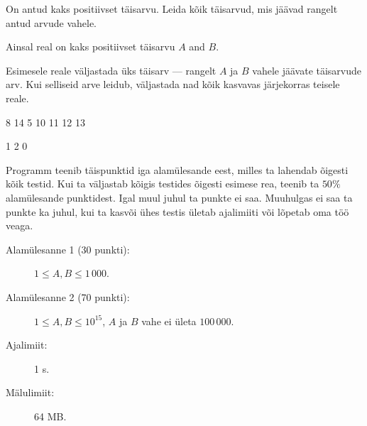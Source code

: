 \documentclass{boi2014-et}
\begin{document}
    On antud kaks positiivset täisarvu. Leida kõik täisarvud, mis
    jäävad rangelt antud arvude vahele.

    \Input

    Ainsal real on kaks positiivset täisarvu $A$ and $B$.

    \Output

    Esimesele reale väljastada üks täisarv --- rangelt $A$ ja $B$
    vahele jäävate täisarvude arv. Kui selliseid arve leidub,
    väljastada nad kõik kasvavas järjekorras teisele reale.
    
    \Examples

    \simpleexample
    {
        8 14
    }
    {
        5  10 11 12 13
    }

    \simpleexample
    {
        1 2
    }
    {
        0
    }

    \Scoring

    Programm teenib täispunktid iga alamülesande eest, milles ta
    lahendab õigesti kõik testid. Kui ta väljastab kõigis testides
    õigesti esimese rea, teenib ta $50\%$ alamülesande punktidest.
    Igal muul juhul ta punkte ei saa. Muuhulgas ei saa ta punkte
    ka juhul, kui ta kasvõi ühes testis ületab ajalimiiti või
    lõpetab oma töö veaga.

    \begin{description}
        \item[Alamülesanne 1 (30 punkti):] $1 \le A, B \le 1\,000$. 
        \item[Alamülesanne 2 (70 punkti):] $1 \le A, B \le 10^{15}$,
            $A$ ja $B$ vahe ei ületa $100\,000$.
    \end{description}

    \Constraints

    \begin{description}
        \item[Ajalimiit:] 1 s.
        \item[Mälulimiit:] 64 MB.
    \end{description}
\end{document}
